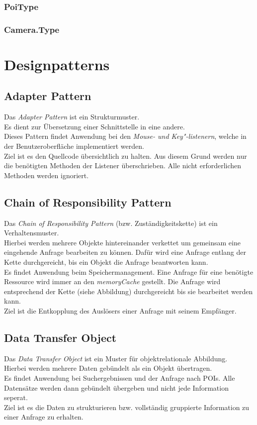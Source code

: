 \documentclass[10pt]{scrreprt}
\begin{document}
\subsection*{PoiType}
\subsection*{Camera.Type}

\chapter{Designpatterns}
\section{Adapter Pattern}
Das \textit{Adapter Pattern} ist ein Strukturmuster. \\
Es dient zur Übersetzung einer Schnittstelle in eine andere. \\ Dieses Pattern findet Anwendung bei den \textit{Mouse- und Key"-listenern}, welche in der Benutzeroberfläche implementiert werden. \\ Ziel ist es den Quellcode übersichtlich zu halten. Aus diesem Grund werden nur die benötigten Methoden der Listener überschrieben. Alle nicht erforderlichen Methoden werden ignoriert.

\section{Chain of Responsibility Pattern}
Das \textit{Chain of Responsibility Pattern} (bzw. Zuständigkeitskette) ist ein Verhaltensmuster. \\
Hierbei werden mehrere Objekte hintereinander verkettet um gemeinsam eine eingehende Anfrage bearbeiten zu können. Dafür wird eine Anfrage entlang der Kette durchgereicht, bis ein Objekt die Anfrage beantworten kann. \\ Es findet Anwendung beim Speichermanagement. Eine Anfrage für eine benötigte Ressource wird immer an den \textit{memoryCache} gestellt. Die Anfrage wird entsprechend der Kette (siehe Abbildung) durchgereicht bis sie bearbeitet werden kann. \\ Ziel ist  die Entkopplung des Auslösers einer Anfrage mit seinem Empfänger.

\section{Data Transfer Object}
Das \textit{Data Transfer Object} ist ein Muster für objektrelationale Abbildung. \\
Hierbei werden mehrere Daten gebündelt als ein Objekt übertragen. \\ Es findet Anwendung bei Suchergebnissen und der Anfrage nach POIs. Alle Datensätze werden dann gebündelt übergeben und nicht jede Information seperat. \\ Ziel ist es die Daten zu strukturieren bzw. vollständig gruppierte Information zu einer Anfrage zu erhalten.
\end{document}
